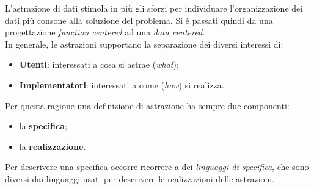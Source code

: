 \documentclass[12pt]{report}
\begin{document}
	L'astrazione di dati stimola in più gli sforzi per individuare l'organizzazione dei dati più consone alla soluzione del problema. Si è passati quindi da una progettazione \textit{function centered} ad una \textit{data centered}. \\
	In generale, le astrazioni supportano la separazione dei diversi interessi di:
	\begin{itemize}
		\item \textbf{Utenti}: interessati a cosa si astrae (\textit{what});
		\item \textbf{Implementatori}: interessati a come (\textit{how}) si realizza.
 	\end{itemize}
 	Per questa ragione una definizione di astrazione ha sempre due componenti:
 	\begin{itemize}
 		\item la \textbf{specifica};
 		\item la \textbf{realizzazione}.
 	\end{itemize}
 	Per descrivere una specifica occorre ricorrere a dei \textit{linguaggi di specifica}, che sono diversi dai linguaggi usati per descrivere le realizzazioni delle astrazioni.
\end{document}
